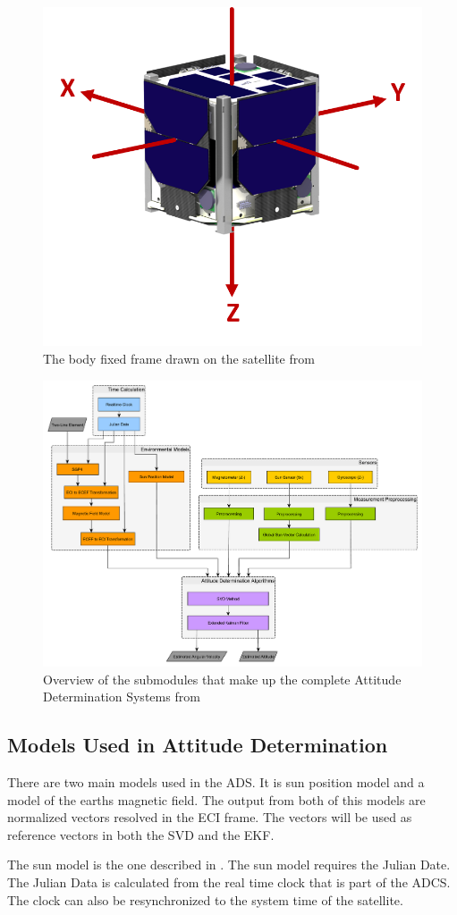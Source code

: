 \begin{figure}[tbp]
	\centering
	\includegraphics[width=0.6\columnwidth]{./Pictures/GBF_new}
	\caption{The body fixed frame drawn on the satellite from \cite{DavidThesis}}
	\label{fig:bodyFix}
\end{figure} 

\begin{figure}[tbp]
	\centering
	\includegraphics[width=0.5\columnwidth]{./Pictures/ATTDET_Architecture_new}
	\caption{Overview of the submodules that make up the complete Attitude Determination Systems from \cite{DavidThesis}}
	\label{fig:ADS_overview}
\end{figure}            

\subsection{Models Used in Attitude Determination}\label{subsec:ModelADS}
There are two main models used in the ADS. It is sun position model and a model of the earths magnetic field. The output from both of this models are normalized vectors resolved in the ECI frame. The vectors will be used as reference vectors in both the SVD and the EKF. 

The sun model is the one described in \cite{AstroPC}. The sun model requires the Julian Date. The Julian Data is calculated from the real time clock that is part of the ADCS. The clock can also be resynchronized to the system time of the satellite\cite{DavidThesis}. 

